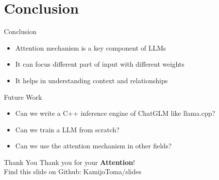 \documentclass{beamer}
\begin{document}
\section{Conclusion}
\begin{frame}{Conclusion}
    \begin{itemize}
        \item Attention mechanism is a key component of LLMs
        \item It can focus different part of input with different weights
        \item It helps in understanding context and relationships
    \end{itemize}
    \begin{block}{Future Work}
        \begin{itemize}
            \item Can we write a C++ inference engine of ChatGLM like llama.cpp?
            \item Can we train a LLM from scratch?
            \item Can we use the attention mechanism in other fields?
        \end{itemize}

    \end{block}
\end{frame}

\begin{frame}{Thank You}
    \centering
    Thank you for your \textbf{Attention}! \\
    \vspace{1cm}
    Find this slide on Github: KamijoToma/slides
\end{frame}
\end{document}
